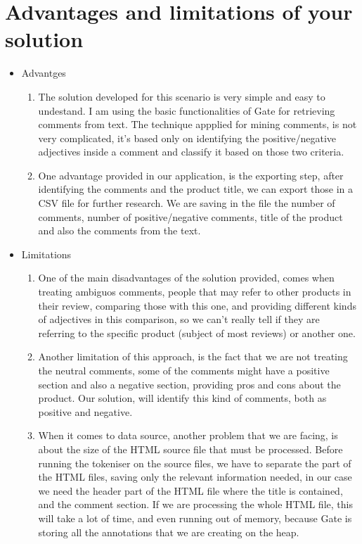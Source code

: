 \documentclass[a4paper,12pt]{report}
\begin{document}
\section{Advantages and limitations of your solution}
\label{sec:lim}
  \begin{itemize}
  
  \item{Advantges}
  \begin{enumerate}
   \item  The solution developed for this scenario is very simple and easy to undestand. I am using the basic functionalities of Gate for retrieving comments from text. The technique appplied for mining comments, is not very complicated, it's based only on identifying the positive/negative adjectives inside a comment and classify it based on those two criteria.
   \item  One advantage provided in our application, is the exporting step, after identifying the comments and the product title, we can export those in a CSV file for further research. We are saving in the file the number of comments, number of positive/negative comments, title of the product and also the comments from the text. 

  \end{enumerate}

  
  \item{Limitations}
  \begin{enumerate}
   \item   One of the main disadvantages of the solution provided, comes when treating ambiguos comments, people that may refer to other products in their review, comparing those with this one, and providing different kinds of adjectives in this comparison, so we can't really tell if they are referring to the specific product (subject of most reviews) or another one.
   \item   Another limitation of this approach, is the fact that we are not treating the neutral comments, some of the comments might have a positive section and also a negative section, providing pros and cons about the product. Our solution, will identify this kind of comments, both as positive and negative.
   \item   When it comes to data source, another problem that we are facing, is about the size of the HTML source file that must be processed. Before running the tokeniser on the source files, we have to separate the part of the HTML files, saving only the relevant information needed, in our case we need the header part of the HTML file where the title is contained, and the comment section. If we are processing the whole HTML file, this will take a lot of time, and even running out of memory, because Gate is storing all the annotations that we are creating on the heap.
  
  \end{enumerate}
  
    \end{itemize}
  
\end{document}
